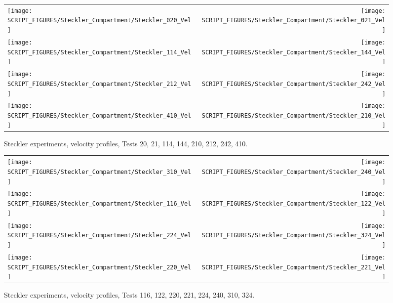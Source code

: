 \begin{figure}[p]
\begin{tabular*}{\textwidth}{l@{\extracolsep{\fill}}r}
\texttt{[image: SCRIPT\_FIGURES/Steckler\_Compartment/Steckler\_020\_Vel]} &
\texttt{[image: SCRIPT\_FIGURES/Steckler\_Compartment/Steckler\_021\_Vel]} \\
\texttt{[image: SCRIPT\_FIGURES/Steckler\_Compartment/Steckler\_114\_Vel]} &
\texttt{[image: SCRIPT\_FIGURES/Steckler\_Compartment/Steckler\_144\_Vel]} \\
\texttt{[image: SCRIPT\_FIGURES/Steckler\_Compartment/Steckler\_212\_Vel]} &
\texttt{[image: SCRIPT\_FIGURES/Steckler\_Compartment/Steckler\_242\_Vel]} \\
\texttt{[image: SCRIPT\_FIGURES/Steckler\_Compartment/Steckler\_410\_Vel]} &
\texttt{[image: SCRIPT\_FIGURES/Steckler\_Compartment/Steckler\_210\_Vel]}
\end{tabular*}
\caption[Steckler experiments, velocity profiles, Tests 20, 21, 114, 144, 210, 212, 242, 410]{Steckler experiments, velocity profiles, Tests 20, 21, 114, 144, 210, 212, 242, 410.}
\label{Steckler_Vel_3}
\end{figure}

\begin{figure}[p]
\begin{tabular*}{\textwidth}{l@{\extracolsep{\fill}}r}
\texttt{[image: SCRIPT\_FIGURES/Steckler\_Compartment/Steckler\_310\_Vel]} &
\texttt{[image: SCRIPT\_FIGURES/Steckler\_Compartment/Steckler\_240\_Vel]} \\
\texttt{[image: SCRIPT\_FIGURES/Steckler\_Compartment/Steckler\_116\_Vel]} &
\texttt{[image: SCRIPT\_FIGURES/Steckler\_Compartment/Steckler\_122\_Vel]} \\
\texttt{[image: SCRIPT\_FIGURES/Steckler\_Compartment/Steckler\_224\_Vel]} &
\texttt{[image: SCRIPT\_FIGURES/Steckler\_Compartment/Steckler\_324\_Vel]} \\
\texttt{[image: SCRIPT\_FIGURES/Steckler\_Compartment/Steckler\_220\_Vel]} &
\texttt{[image: SCRIPT\_FIGURES/Steckler\_Compartment/Steckler\_221\_Vel]}
\end{tabular*}
\caption[Steckler experiments, velocity profiles, Tests 116, 122, 220, 221, 224, 240, 310, 324]{Steckler experiments, velocity profiles, Tests 116, 122, 220, 221, 224, 240, 310, 324.}
\label{Steckler_Vel_4}
\end{figure}

